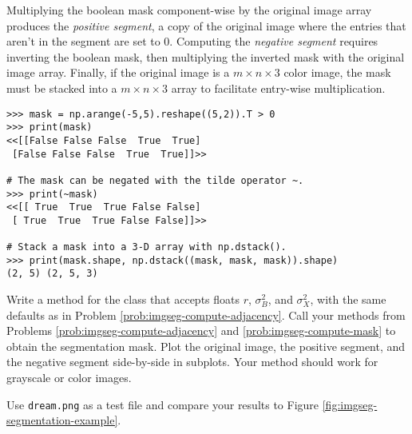 Multiplying the boolean mask component-wise by the original image array produces the \emph{positive segment}, a copy of the original image where the entries that aren't in the segment are set to $0$.
Computing the \emph{negative segment} requires inverting the boolean mask, then multiplying the inverted mask with the original image array.
Finally, if the original image is a $m \times n \times 3$ color image, the mask must be stacked into a $m \times n \times 3$ array to facilitate entry-wise multiplication.

\begin{lstlisting}
>>> mask = np.arange(-5,5).reshape((5,2)).T > 0
>>> print(mask)
<<[[False False False  True  True]
 [False False False  True  True]]>>

# The mask can be negated with the tilde operator ~.
>>> print(~mask)
<<[[ True  True  True False False]
 [ True  True  True False False]]>>

# Stack a mask into a 3-D array with np.dstack().
>>> print(mask.shape, np.dstack((mask, mask, mask)).shape)
(2, 5) (2, 5, 3)
\end{lstlisting}

\begin{problem}
Write a method for the  class that accepts floats $r$, $\sigma_B^2$, and $\sigma_X^2$, with the same defaults as in Problem \ref{prob:imgseg-compute-adjacency}.
Call your methods from Problems \ref{prob:imgseg-compute-adjacency} and \ref{prob:imgseg-compute-mask} to obtain the segmentation mask.
Plot the original image, the positive segment, and the negative segment side-by-side in subplots.
Your method should work for grayscale or color images.

Use \texttt{dream.png} as a test file and compare your results to Figure \ref{fig:imgseg-segmentation-example}.
\end{problem}

\begin{comment} %

\newpage

\section*{Additional Material} %

\subsection*{Products of Adjacency Matrices} %

\subsection*{Other Methods for Image Segmentation} %

\end{comment}
